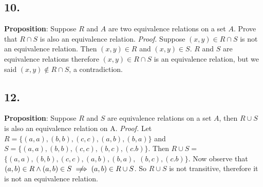 \documentclass[12pt]{article}
\begin{document}
\begin{minipage}[t]{0.40\textwidth}

\subsection*{10.}
\textbf{Proposition}: Suppose $ R $ and $ A $ are two equivalence relations on a set $ A $. Prove that $ R\cap S $ is also an equivalence relation.
\newline\textit{Proof.} Suppose $ (x,y)\in R\cap S $ is not an equivalence relation. Then $ (x,y)\in R $ and $ (x,y)\in S $. $ R $ and $ S $ are equivalence relations therefore  $ (x,y)\in R\cap S $ is an equivalence relation, but we said  $ (x,y)\not\in R\cap S $, a contradiction.

\subsection*{12.}
\textbf{Proposition}: Suppose $ R $ and $ S $ are equivalence relations on a set $ A $, then $ R\cup S $ is also an equivalence relation on A.
\newline\textit{Proof.} Let $ R=\{(a,a),(b,b),(c,c),(a,b),(b,a)\} $ and $ S=\{(a,a),(b,b),(c,c),(b,c),(c.b)\} $. Then $ R\cup S=$  $ \{(a,a),(b,b),(c,c),(a,b),(b,a),$  $(b,c),(c.b)\}$.
Now observe that $ (a,b)\in R \land (a,b)\in S \centernot\implies (a,b)\in R\cup S$. So $ R\cup S $ is not transitive, therefore it is not an equivalence relation.


\end{minipage}
\hfill\vline\hfill
\end{document}
